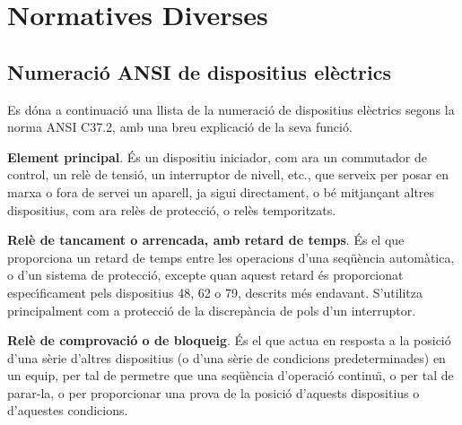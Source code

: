 \chapter{Normatives Diverses}

\section{Numeraci\'{o} ANSI de dispositius el\`{e}ctrics} 

Es d\'{o}na a continuaci\'{o} una llista de la numeraci\'{o} de dispositius
el\`{e}ctrics segons la norma \textsf{ANSI C37.2}, amb una breu
explicaci\'{o} de la seva funci\'{o}.

\begin{multicols}{2}
\begin{list}{}
{\setlength{\labelwidth}{6mm} \setlength{\leftmargin}{6mm}
\setlength{\labelsep}{2mm}}

\item[\textbf{1}]  \textbf{Element principal}. \'{E}s un dispositiu
iniciador, com ara un commutador de control, un rel\`{e} de tensi\'{o}, un
interruptor de nivell, etc., que serveix per posar en marxa o fora
de servei un aparell, ja sigui directament, o b\'{e}  mitjan\c{c}ant altres
dispositius, com ara rel\`{e}s de protecci\'{o}, o rel\`{e}s temporitzats.

\item[\textbf{2}]  \textbf{Rel\`{e}
de tancament o arrencada, amb retard de temps}. \'{E}s el que
proporciona un retard de temps entre les operacions d'una seq\"{u}\`{e}ncia
autom\`{a}tica, o d'un sistema de protecci\'{o}, excepte quan aquest retard
\'{e}s proporcionat espec\'{\i}ficament pels dispositius 48, 62 o 79,
descrits m\'{e}s endavant. S'utilitza principalment com a protecci\'{o} de
la discrep\`{a}ncia de pols d'un interruptor.

\item[\textbf{3}]  \textbf{Rel\`{e} de comprovaci\'{o} o
de bloqueig}. \'{E}s el que actua en resposta a la posici\'{o} d'una s\`{e}rie
d'altres dispositius (o d'una s\`{e}rie de condicions predeterminades)
en un equip, per tal de permetre que una seq\"{u}\`{e}ncia d'operaci\'{o}
continu\"{\i}, o per tal de parar-la, o per proporcionar una prova de la
posici\'{o} d'aquests dispositius o d'aquestes condicions.


\end{list}
\end{multicols}
